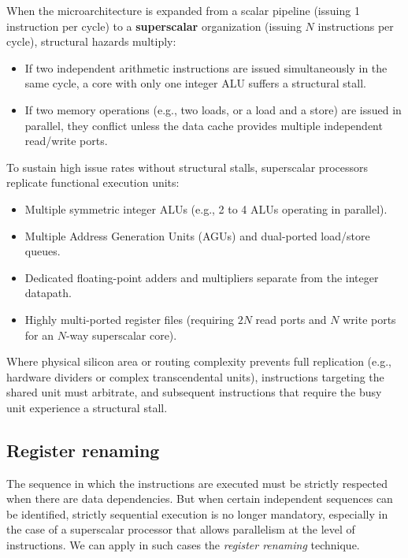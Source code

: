 When the microarchitecture is expanded from a scalar pipeline (issuing 1 instruction per cycle) to a \textbf{superscalar} organization (issuing $N$ instructions per cycle), structural hazards multiply:
\begin{itemize}
    \item If two independent arithmetic instructions are issued simultaneously in the same cycle, a core with only one integer ALU suffers a structural stall.
    \item If two memory operations (e.g., two loads, or a load and a store) are issued in parallel, they conflict unless the data cache provides multiple independent read/write ports.
\end{itemize}
To sustain high issue rates without structural stalls, superscalar processors replicate functional execution units:
\begin{itemize}
    \item Multiple symmetric integer ALUs (e.g., 2 to 4 ALUs operating in parallel).
    \item Multiple Address Generation Units (AGUs) and dual-ported load/store queues.
    \item Dedicated floating-point adders and multipliers separate from the integer datapath.
    \item Highly multi-ported register files (requiring $2N$ read ports and $N$ write ports for an $N$-way superscalar core).
\end{itemize}
Where physical silicon area or routing complexity prevents full replication (e.g., hardware dividers or complex transcendental units), instructions targeting the shared unit must arbitrate, and subsequent instructions that require the busy unit experience a structural stall.

\subsection{Register renaming}

The sequence in which the instructions are executed must be strictly respected when there are data dependencies. But when certain independent sequences can be identified, strictly sequential execution is no longer mandatory, especially in the case of a superscalar processor that allows parallelism at the level of instructions. We can apply in such cases the {\em register renaming} technique.

